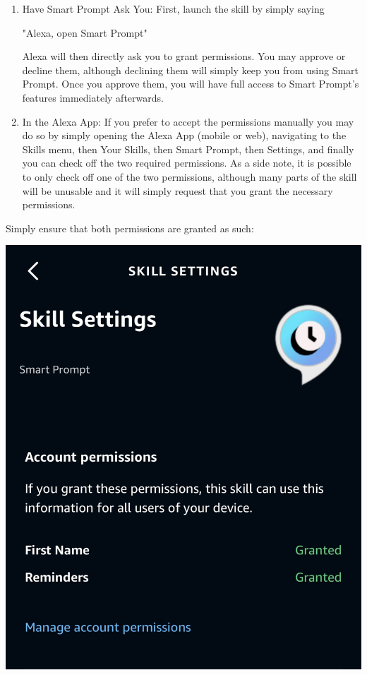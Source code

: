 \documentclass[11pt, oneside]{article}
\begin{document}
\begin{enumerate}
  \item Have Smart Prompt Ask You:
First, launch the skill by simply saying
\begin{center}
"Alexa, open Smart Prompt"
\end{center}
Alexa will then directly ask you to grant permissions. You may approve or decline them, although declining them will simply keep you from using Smart Prompt. Once you approve them, you will have full access to Smart Prompt's features immediately afterwards.
  \item In the Alexa App:
If you prefer to accept the permissions manually you may do so by simply opening the Alexa App (mobile or web), navigating to the Skills menu, then Your Skills, then Smart Prompt, then Settings, and finally you can check off the two required permissions.
As a side note, it is possible to only check off one of the two permissions, although many parts of the skill will be unusable and it will simply request that you grant the necessary permissions.
\end{enumerate}

Simply ensure that both permissions are granted as such:
\begin{center}
  \includegraphics[width=\linewidth * 1/2]{images/skillPermissions.jpg}
\end{center}
\end{document}
